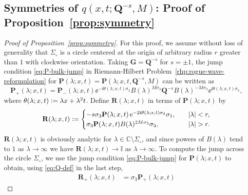 \subsection{Symmetries of $q(x,t;\mathbf{Q}^{-s},M)$:  Proof of Proposition~\ref{prop:symmetry}}
\begin{proof}[Proof of Proposition~\ref{prop:symmetry}]
For this proof, we assume without loss of generality that $\Sigma_\circ$ is a circle centered at the origin of arbitrary radius $r$ greater than $1$ with clockwise orientation.
Taking $\mathbf{G}=\mathbf{Q}^{-s}$ for $s=\pm 1$, the jump condition \eqref{eq:P-bulk-jump} in Riemann-Hilbert Problem~\ref{rhp:rogue-wave-reformulation} for $\mathbf{P}(\lambda;x,t)=\mathbf{P}(\lambda;x,t,\mathbf{Q}^{-s},M)$ can be written as 
\begin{equation}
\mathbf{P}_+(\lambda;x,t)=\mathbf{P}_-(\lambda;x,t)\ee^{-\ii\theta(\lambda;x,t)\sigma_3}%
B(\lambda)^{M\sigma_3}
\mathbf{Q}^{-s}%
B(\lambda)^{-M\sigma_3}
\ee^{\ii\theta(\lambda;x,t)\sigma_3},
\label{eq:P-bulk-jump-rewrite}
\end{equation}
where $\theta(\lambda;x,t)\vcentcolon=\lambda x+\lambda^2t$. 
Define $\mathbf{R}(\lambda;x,t)$ in terms of $\mathbf{P}(\lambda;x,t)$ by
\begin{equation}
\mathbf{R}(\lambda;x,t)\defeq\begin{cases}
-s\sigma_3\mathbf{P}(\lambda;x,t)\ee^{-2\ii\theta(\lambda;x,t)\sigma_3}\sigma_1,&\quad |\lambda|<r,
\\
\sigma_3\mathbf{P}(\lambda;x,t)%
B(\lambda)^{2M\sigma_3}
\sigma_3,&\quad |\lambda|>r.
\end{cases}
\end{equation} 
$\mathbf{R}(\lambda;x,t)$ is obviously analytic for $\lambda\in\mathbb{C}\setminus\Sigma_\circ$, and since 
powers of $B(\lambda)$ tend to $1$ 
as $\lambda\to\infty$ we have $\mathbf{R}(\lambda;x,t)\to\mathbb{I}$ as $\lambda\to\infty$.  To compute the jump across the circle $\Sigma_\circ$, we use the jump condition \eqref{eq:P-bulk-jump} for $\mathbf{P}(\lambda;x,t)$ to obtain, using \eqref{eq:Q-def} in the last step,
\begin{equation}
\begin{split}
\mathbf{R}_+(\lambda;x,t)&=\sigma_3\mathbf{P}_+(\lambda;x,t)

\end{split}
\end{equation}
\end{proof}
